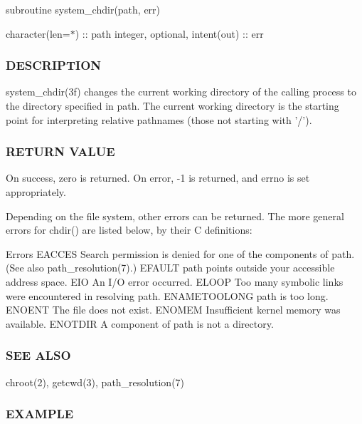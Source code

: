 subroutine system\+\_\+chdir(path, err)

character(len=$\ast$) \+:\+: path integer, optional, intent(out) \+:\+: err

\subsubsection*{D\+E\+S\+C\+R\+I\+P\+T\+I\+ON}

\begin{DoxyVerb}system_chdir(3f) changes the current working directory of the calling
process to the directory specified in path. The current working
directory is the starting point for interpreting relative pathnames
(those not starting with '/').
\end{DoxyVerb}


\subsubsection*{R\+E\+T\+U\+RN V\+A\+L\+UE}

\begin{DoxyVerb}On success, zero is returned. On error, -1 is returned, and errno is
set appropriately.


Depending on the file system, other errors can be returned. The more
general errors for chdir() are listed below, by their C definitions:

Errors
EACCES        Search permission is denied for one of the components of path.
              (See also path_resolution(7).)
EFAULT        path points outside your accessible address space.
EIO           An I/O error occurred.
ELOOP         Too many symbolic links were encountered in resolving path.
ENAMETOOLONG  path is too long.
ENOENT        The file does not exist.
ENOMEM        Insufficient kernel memory was available.
ENOTDIR       A component of path is not a directory.
\end{DoxyVerb}


\subsubsection*{S\+EE A\+L\+SO}

\begin{DoxyVerb}chroot(2), getcwd(3), path_resolution(7)
\end{DoxyVerb}


\subsubsection*{E\+X\+A\+M\+P\+LE}

